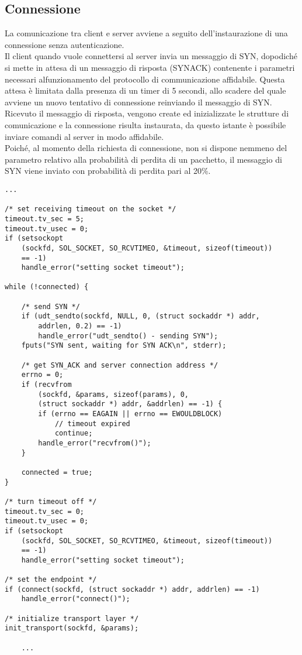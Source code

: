 \subsection{Connessione}
La comunicazione tra client e server avviene a seguito dell'instaurazione di una connessione senza autenticazione.\\
Il client quando vuole connettersi al server invia un messaggio di SYN, dopodiché si mette in attesa di un messaggio di risposta (SYNACK) contenente i parametri necessari alfunzionamento del protocollo di communicazione affidabile. Questa attesa è limitata dalla presenza di un timer di 5 secondi, allo scadere del quale avviene un nuovo tentativo di connessione reinviando il messaggio di SYN.\\
Ricevuto il messaggio di risposta, vengono create ed inizializzate le strutture di comunicazione e la connessione risulta instaurata, da questo istante è possibile inviare comandi al server in modo affidabile.\\
Poiché, al momento della richiesta di connessione, non si dispone nemmeno del parametro relativo alla probabilità di perdita di un pacchetto, il messaggio di SYN viene inviato con probabilità di perdita pari al 20\%.

\begin{lstlisting}[title=client: instaurazione della connessione]
	...

/* set receiving timeout on the socket */
timeout.tv_sec = 5;
timeout.tv_usec = 0;
if (setsockopt
	(sockfd, SOL_SOCKET, SO_RCVTIMEO, &timeout, sizeof(timeout))
	== -1)
	handle_error("setting socket timeout");

while (!connected) {

	/* send SYN */
	if (udt_sendto(sockfd, NULL, 0, (struct sockaddr *) addr, 
		addrlen, 0.2) == -1)
		handle_error("udt_sendto() - sending SYN");
	fputs("SYN sent, waiting for SYN ACK\n", stderr);

	/* get SYN_ACK and server connection address */
	errno = 0;
	if (recvfrom
		(sockfd, &params, sizeof(params), 0,
		(struct sockaddr *) addr, &addrlen) == -1) {
		if (errno == EAGAIN || errno == EWOULDBLOCK)
			// timeout expired
			continue;
		handle_error("recvfrom()");
	}

	connected = true;
}

/* turn timeout off */
timeout.tv_sec = 0;
timeout.tv_usec = 0;
if (setsockopt
	(sockfd, SOL_SOCKET, SO_RCVTIMEO, &timeout, sizeof(timeout)) 
	== -1)
	handle_error("setting socket timeout");

/* set the endpoint */
if (connect(sockfd, (struct sockaddr *) addr, addrlen) == -1)
	handle_error("connect()");

/* initialize transport layer */
init_transport(sockfd, &params);

	...
\end{lstlisting}

